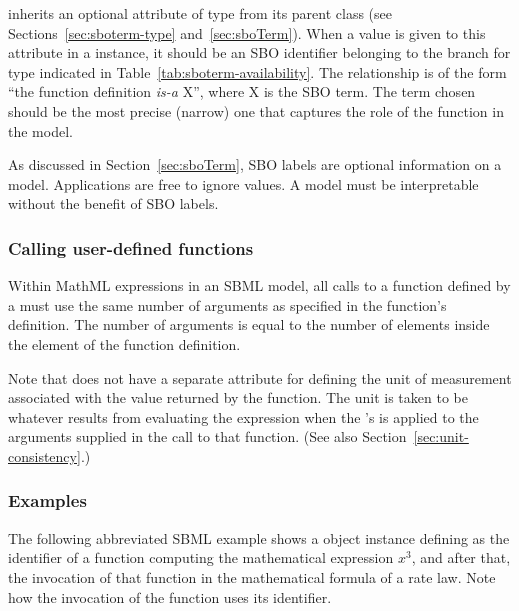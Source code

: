 \FunctionDefinition inherits an optional 
attribute of type  from its parent
class \SBase (see Sections~\ref{sec:sboterm-type}
and~\ref{sec:sboTerm}).  When a value is given to this
attribute in a \FunctionDefinition instance, it should be an
SBO identifier belonging to the branch for type \FunctionDefinition 
indicated in Table~\ref{tab:sboterm-availability}.  The relationship is
of the form ``the function definition \emph{is-a} X'', where X is
the SBO term.  The term chosen should be the most precise (narrow)
one that captures the role of the function in the model.

As discussed in Section~\ref{sec:sboTerm}, SBO labels are optional
information on a model.  Applications are free to ignore
 values.  A model must be interpretable without the
benefit of SBO labels.


\subsubsection{Calling user-defined functions}
\label{sec:functiondefinition-calling}

Within MathML expressions in an SBML model, all calls to a
function defined by a \FunctionDefinition must use the same number
of arguments as specified in the function's definition.  The
number of arguments is equal to the number of 
elements inside the  element of the function
definition.

Note that \FunctionDefinition does not have a separate attribute
for defining the unit of measurement associated with the value
returned by the function.  The unit is taken to be whatever
results from evaluating the expression when the
\FunctionDefinition's  is applied to the arguments
supplied in the call to that function.  (See also
Section~\ref{sec:unit-consistency}.)


\subsubsection{Examples}

The following abbreviated SBML example shows a \FunctionDefinition
object instance defining  as the identifier of a function
computing the mathematical expression $x^{3}$, and after that, the
invocation of that function in the mathematical formula of a rate
law.  Note how the invocation of the function uses its identifier.

